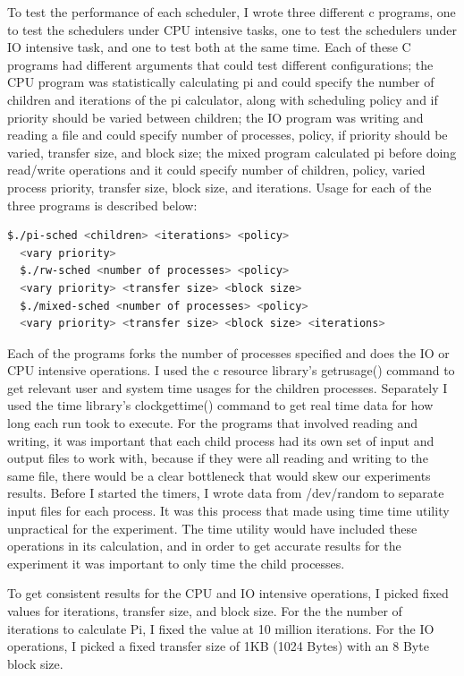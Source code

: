 \documentclass{article}
\begin{document}
To test the performance of each scheduler, I wrote three different c programs, one to test the schedulers under CPU intensive tasks, one to test the schedulers under IO intensive task, and one to test both at the same time. Each of these C programs had different arguments that could test different configurations; the CPU program was statistically calculating pi and could specify the number of children and iterations of the pi calculator, along with scheduling policy and if priority should be varied between children; the IO program was writing and reading a file and could specify number of processes, policy, if priority should be varied, transfer size, and block size; the mixed program calculated pi before doing read/write operations and it could specify number of children, policy, varied process priority, transfer size, block size, and iterations. Usage for each of the three programs is described below:

\begin{lstlisting}[language=bash]
  $./pi-sched <children> <iterations> <policy>
  <vary priority>
  $./rw-sched <number of processes> <policy>
  <vary priority> <transfer size> <block size>
  $./mixed-sched <number of processes> <policy>
  <vary priority> <transfer size> <block size> <iterations>
\end{lstlisting}

Each of the programs forks the number of processes specified and does the IO or CPU intensive operations. I used the c resource library’s getrusage() command to get relevant user and system time usages for the children processes. Separately I used the time library’s clockgettime() command to get real time data for how long each run took to execute. For the programs that involved reading and writing, it was important that each child process had its own set of input and output files to work with, because if they were all reading and writing to the same file, there would be a clear bottleneck that would skew our experiments results. Before I started the timers, I wrote data from /dev/random to separate input files for each process. It was this process that made using time time utility unpractical for the experiment. The time utility would have included these operations in its calculation, and in order to get accurate results for the experiment it was important to only time the child processes.

To get consistent results for the CPU and IO intensive operations, I picked fixed values for iterations, transfer size, and block size. For the the number of iterations to calculate Pi, I fixed the value at 10 million iterations. For the IO operations, I picked a fixed transfer size of 1KB (1024 Bytes) with an 8 Byte block size.
\end{document}
